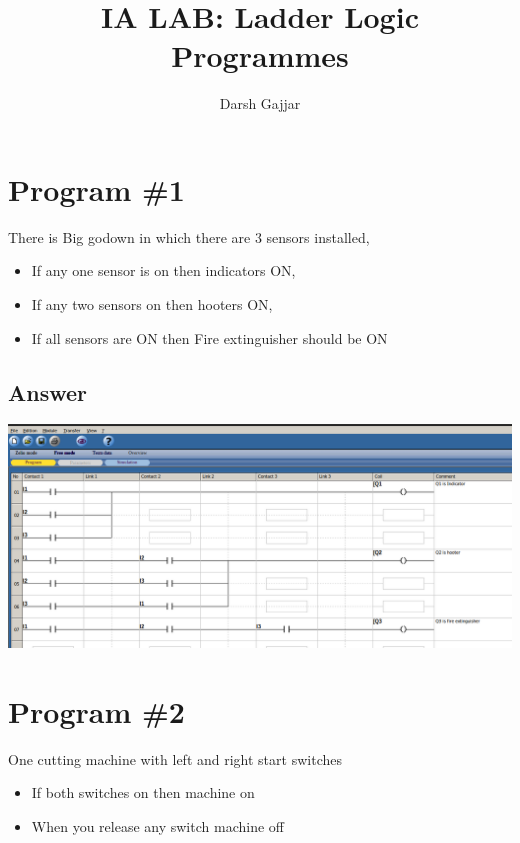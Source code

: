 \documentclass[
	12pt, %
]{fphw}
\title{IA LAB: Ladder Logic Programmes} %
\author{Darsh Gajjar} %
\institute{SVNIT, SURAT \\ M. Tech. I \& C (Electrical Department)} %
\begin{document}


\maketitle %


\section*{Program \#1}

\begin{problem}
\medskip
	There is Big godown in which there are 3 sensors installed,
 \renewcommand{\labelitemi}
 {$\blacksquare$}
 \begin{itemize} 
    \item If any one sensor is on then indicators ON,
    \item If any two sensors on then hooters ON,
    \item If all sensors are ON then Fire extinguisher should be ON
  \end{itemize} 
\end{problem}
\subsection*{Answer}
 \begin{center}
 \includegraphics[width=165mm, scale=0.80]{prg1.png} %
 \end{center}
\section*{Program \#2}
\medskip
 One cutting machine with left and right start switches
 \renewcommand{\labelitemi}
 {$\blacksquare$}
  \begin{itemize}%
    \item If both switches on then machine on
    \item When you release any switch machine off
  \end{itemize}
\end{document}
